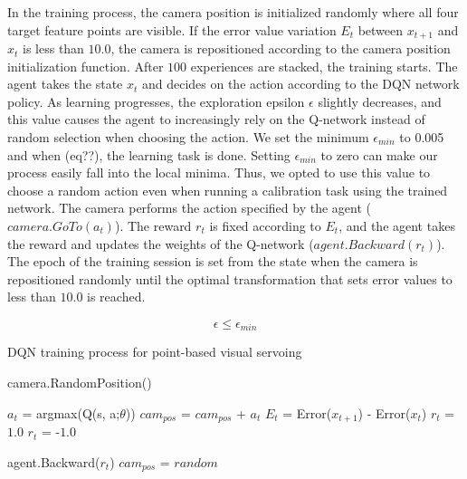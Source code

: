 \documentclass[10pt]{article}
\begin{document}
In the training process, the camera position is initialized randomly where all four target feature points are visible. If the error value variation $E_t$ between $x_{t+1}$ and $x_t$ is less than $10.0$, the camera is repositioned according to the camera position initialization function. After $100$ experiences are stacked, the training starts. The agent takes the state $x_t$ and decides on the action according to the DQN network policy. As learning progresses, the exploration epsilon $\epsilon$ slightly decreases, and this value causes the agent to increasingly rely on the Q-network instead of random selection when choosing the action. We set the minimum $\epsilon_{min}$ to 0.005 and when (eq??), the learning task is done. Setting $\epsilon_{min}$ to zero can make our process easily fall into the local minima. Thus, we opted to use this value to choose a random action even when running a calibration task using the trained network. The camera performs the action specified by the agent ($camera.GoTo(a_t)$). The reward $r_t$ is fixed according to $E_t$, and the agent takes the reward and updates the weights of the Q-network ($agent.Backward(r_t)$).
The epoch of the training session is set from the state when the camera is repositioned randomly until the optimal transformation that sets error values to less than $10.0$ is reached.


\begin{equation}\label{eq2}
  \epsilon \leq \epsilon_{min}
\end{equation}

 \begin{algorithm}
   \caption{DQN training process for point-based visual servoing}\label{algo1}
   \begin{algorithmic}[1]

     \State camera.RandomPosition()



     \State $a_t$ =  argmax(Q(s, a;$\theta$))
     \State $cam_{pos}$ = $cam_{pos}$ + $a_t$
     \State $E_t$ = Error($x_{t+1}$) - Error($x_t$)
     \State $r_t$ = $1.0$
     \Else
     \State $r_t$ = -$1.0$
     \EndIf

     agent.Backward($r_t$)
     $cam_{pos}$ = $random$
     \EndIf

     \EndFor

   \end{algorithmic}
 \end{algorithm}
\end{document}
